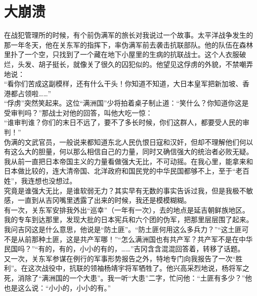 \fancyhead[RO]{} %
\fancyhead[LE]{} %
\chapter*{大崩溃}
\thispagestyle{empty}
在战犯管理所的时候，有个前伪满军的旅长对我说过一个故事。太平洋战争发生的那一年冬天，他在关东军的指挥下，率伪满军前去袭击抗联部队。他的队伍在森林里扑了一个空，只找到了一个藏在地下小屋里的生病的抗联战士。这个人衣服破烂，头发、胡子挺长，就像关了很久的囚犯似的。他望见这俘虏的外貌，不禁嘲弄地说：\\

“看你们苦成这副模样，还有什么干头！你知道不知道，大日本皇军把新加坡、香港都占领啦……”\\

“俘虏”突然笑起来。这位“满洲国”少将拍着桌子制止道：“笑什么？你知道你这是受审判吗？”那战士对他的回答，叫他大吃一惊：\\

“谁审判谁？你们的末日不远了，要不了多长时候，你们这群人，都要受人民的审判！”\\

伪满的文武官员，一般说来都知道东北人民仇恨日寇和汉奸，但却不理解他们何以有这么大的胆量，何以那么相信自己的力量，同时又确信强大的统治者必败无疑。我从前一直把日本帝国主义的力量看做强大无比，不可动摇。在我心里，能拿来和日本做比较的，连大清帝国、北洋政府和国民党的中华民国都够不上，至于“老百姓”，我连想也没想过。\\

究竟是谁强大无比，是谁软弱无力？其实早有无数的事实告诉过我，但是我极不敏感，一直到从吉冈嘴里透露了出来的时候，我还是模模糊糊。\\

有一次，关东军安排我外出“巡幸”（一年有一次），去的地点是延吉朝鲜族地区。我的专车到达那里，发现大批的日本宪兵和六个团的伪军，把那里层层围了起来。我问吉冈这是什么意思，他说是“防土匪”。“防土匪何用这么多兵力？”“这土匪可不是从前那种土匪，这是共产军哪！”“怎么满洲国也有共产军？共产军不是在中华民国吗？”“有的，有的，小小的有的，……”吉冈含含混混回答着，转移了话题。\\

又一次，关东军参谋在例行的军事形势报告之外，特地专门向我报告了一次“胜利”。在这次战役中，抗联的领袖杨靖宇将军牺牲了。他兴高采烈地说，杨将军之死，消除了“满洲国的一个大患”。我一听“大患”二字，忙问他：“土匪有多少？”他也是这么说：“小小的，小小的有。”\\

